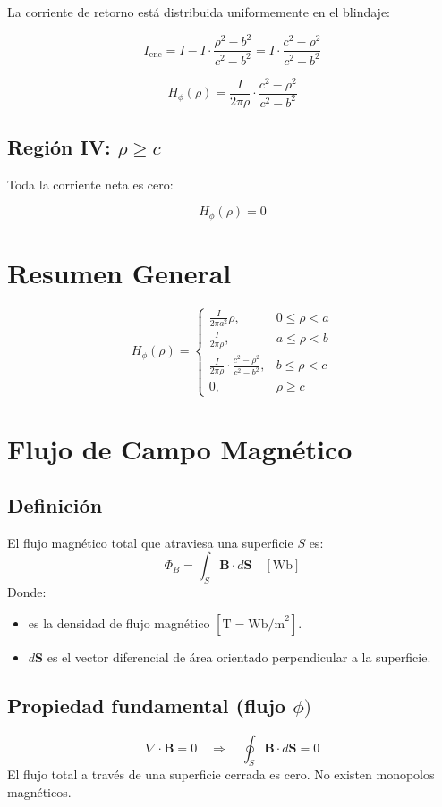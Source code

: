 \documentclass[11pt]{article}
\begin{document}
La corriente de retorno está distribuida uniformemente en el blindaje:

\[
I_{\text{enc}} = I - I \cdot \frac{\rho^2 - b^2}{c^2 - b^2}
= I \cdot \frac{c^2 - \rho^2}{c^2 - b^2}
\]

\[
H_\phi(\rho) = \frac{I}{2\pi \rho} \cdot \frac{c^2 - \rho^2}{c^2 - b^2}
\]

\subsection*{Región IV: \( \rho \geq c \)}

Toda la corriente neta es cero:

\[
H_\phi(\rho) = 0
\]

\section*{Resumen General}

\[
H_\phi(\rho) = 
\begin{cases}
\displaystyle \frac{I}{2\pi a^2} \rho, & 0 \leq \rho < a \\[10pt]
\displaystyle \frac{I}{2\pi \rho}, & a \leq \rho < b \\[10pt]
\displaystyle \frac{I}{2\pi \rho} \cdot \frac{c^2 - \rho^2}{c^2 - b^2}, & b \leq \rho < c \\[10pt]
0, & \rho \geq c
\end{cases}
\]

\newpage

\section{Flujo de Campo Magnético}
\subsection*{Definición}
El flujo magnético total que atraviesa una superficie \(S\) es:
\[
\Phi_{B} = \int_{S} \mathbf{B} \cdot d\mathbf{S}
\quad [\text{Wb}]
\]
Donde:
\begin{itemize}
  \item {} es la densidad de flujo magnético \([\text{T} = \text{Wb/m}^2]\).
  \item \(d\mathbf{S}\) es el vector diferencial de área orientado perpendicular a la superficie.
\end{itemize}

\subsection*{Propiedad fundamental (flujo \(\phi)\)}
\[
\nabla \cdot \mathbf{B} = 0 \quad \Rightarrow \quad
\oint_{S} \mathbf{B} \cdot d\mathbf{S} = 0
\]
El flujo total a través de una superficie cerrada es cero. No existen monopolos magnéticos.
\end{document}
